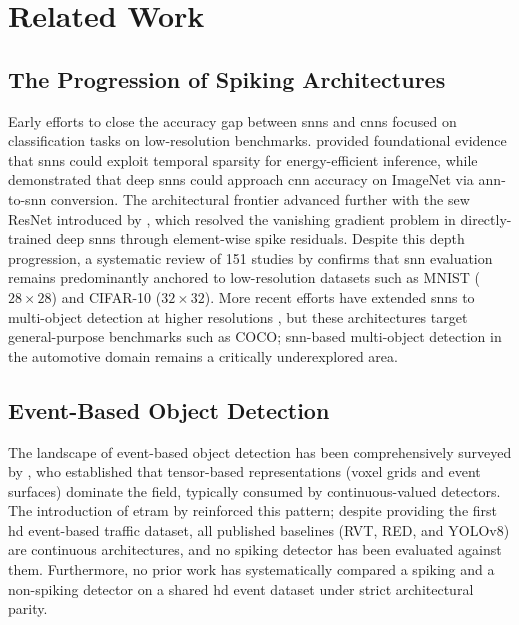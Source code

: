 \section{Related Work}
\label{sec:background_related_work}

\subsection{The Progression of Spiking Architectures}

Early efforts to close the accuracy gap between \glspl{snn} and \glspl{cnn} focused on classification tasks on low-resolution benchmarks.
\textcite{pfeiffer_snn_opportunities} provided foundational evidence that \glspl{snn} could exploit temporal sparsity for energy-efficient inference, while \textcite{sengupta2019goingdeeperspikingneural} demonstrated that deep \glspl{snn} could approach \gls{cnn} accuracy on ImageNet via \gls{ann}-to-\gls{snn} conversion.
The architectural frontier advanced further with the \gls{sew} ResNet introduced by \textcite{fang2022resnet_sew}, which resolved the vanishing gradient problem in directly-trained deep \glspl{snn} through element-wise spike residuals.
Despite this depth progression, a systematic review of 151 studies by \textcite{iaboni2024review} confirms that \gls{snn} evaluation remains predominantly anchored to low-resolution datasets such as MNIST ($28{\times}28$) and CIFAR-10 ($32{\times}32$).
More recent efforts have extended \glspl{snn} to multi-object detection at higher resolutions \cite{fan2025spikedet, spike_yolo, ems_yolo, espikeformer},
but these architectures target general-purpose benchmarks such as COCO; \gls{snn}-based multi-object detection in the automotive domain remains a critically underexplored area.

\subsection{Event-Based Object Detection}

The landscape of event-based object detection has been comprehensively surveyed by \textcite{gallego2020event}, who established that tensor-based representations (voxel grids and event surfaces) dominate the field, typically consumed by continuous-valued detectors.
The introduction of \gls{etram} by \textcite{Verma_2024_CVPR} reinforced this pattern; despite providing the first \gls{hd} event-based traffic dataset, all published baselines (RVT, RED, and YOLOv8) are continuous architectures, and no spiking detector has been evaluated against them.
Furthermore, no prior work has systematically compared a spiking and a non-spiking detector on a shared \gls{hd} event dataset under strict architectural parity.

